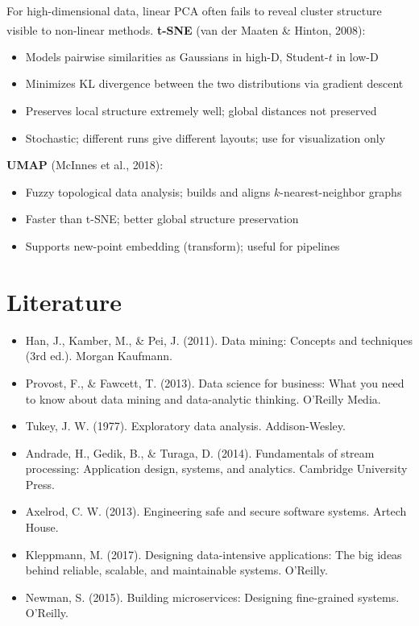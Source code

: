 \begin{tcbitemize}[ skin=sectionraster ]
    \tcbitem[title={t-SNE \& UMAP}, raster multicolumn=3]
    For high-dimensional data, linear PCA often fails to reveal cluster structure visible to non-linear methods\textsuperscript{\cite{hastieElementsStatisticalLearning2008}}.
    \tcblower
    \textbf{t-SNE} (van der Maaten \& Hinton, 2008):
    \begin{itemize}
        \item Models pairwise similarities as Gaussians in high-D, Student-$t$ in low-D
        \item Minimizes KL divergence between the two distributions via gradient descent
        \item Preserves local structure extremely well; global distances not preserved
        \item Stochastic; different runs give different layouts; use for visualization only
    \end{itemize}
    \textbf{UMAP} (McInnes et al., 2018):
    \begin{itemize}
        \item Fuzzy topological data analysis; builds and aligns $k$-nearest-neighbor graphs
        \item Faster than t-SNE; better global structure preservation
        \item Supports new-point embedding (transform); useful for pipelines
    \end{itemize}
\end{tcbitemize}

\section{Literature}
\begin{itemize}
    \item Han, J., Kamber, M., \& Pei, J. (2011). Data mining: Concepts and techniques (3rd ed.). Morgan Kaufmann.
    \item Provost, F., \& Fawcett, T. (2013). Data science for business: What you need to know about data mining and data-analytic thinking. O'Reilly Media.
    \item Tukey, J. W. (1977). Exploratory data analysis. Addison-Wesley.
    \item Andrade, H., Gedik, B., \& Turaga, D. (2014). Fundamentals of stream processing: Application
          design, systems, and analytics. Cambridge University Press.
    \item Axelrod, C. W. (2013). Engineering safe and secure software systems. Artech House.
    \item Kleppmann, M. (2017). Designing data-intensive applications: The big ideas behind reliable,
          scalable, and maintainable systems. O'Reilly.
    \item Newman, S. (2015). Building microservices: Designing fine-grained systems. O'Reilly.
\end{itemize}
